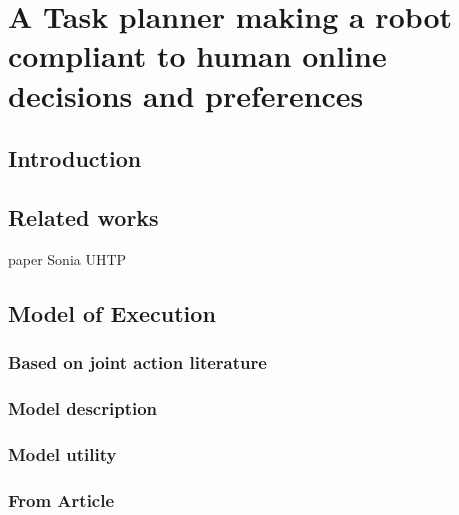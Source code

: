 \ifdefined{}
\else
\setcounter{chapter}{3} %
\dominitoc
\faketableofcontents
\fi

\chapter{A Task planner making a robot compliant to human online decisions and preferences}
\label{chap:4}
\minitoc


\section{Introduction}

\section{Related works}
paper Sonia UHTP



\section{Model of Execution}

\subsection{Based on joint action literature}

\subsection{Model description}

\subsection{Model utility}

\subsection{From Article}

